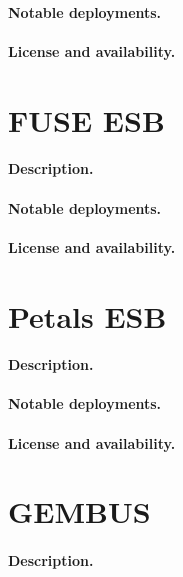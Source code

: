 \documentclass[a4paper]{report}
\begin{document}
\paragraph{Notable deployments.}

\paragraph{License and availability.}


\section{FUSE ESB}

\paragraph{Description.}

\paragraph{Notable deployments.}

\paragraph{License and availability.}



\section{Petals ESB}

\paragraph{Description.}

\paragraph{Notable deployments.}

\paragraph{License and availability.}


\section{GEMBUS}

\paragraph{Description.}
\end{document}
